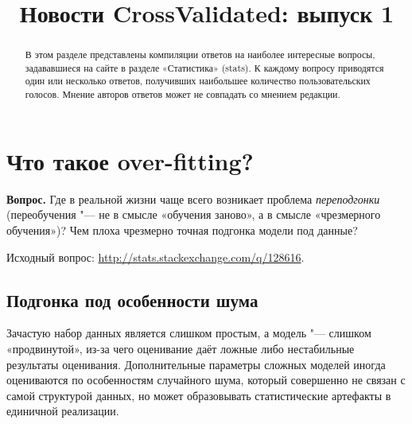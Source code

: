 \documentclass[final,pdftex]{../../template/epsilonj}
\begin{document}
\begin{frontmatter}
\title{Новости CrossValidated: выпуск 1}

\begin{aug}
\author{ }%



\address{НИУ ВШЭ, Москва.}
\end{aug}

\begin{abstract}
В этом разделе представлены компиляции ответов на наиболее интересные вопросы, задававшиеся на сайте  в разделе «Статистика» (stats). К каждому вопросу приводятся один или несколько ответов, получивших наибольшее количество пользовательских голосов. Мнение авторов ответов может не совпадать со мнением редакции.
\end{abstract}

\begin{keyword}
\end{keyword}

\end{frontmatter}


\section{Что такое over-fitting?}

\textbf{Вопрос.} Где в реальной жизни чаще всего возникает проблема \textit{переподгонки} (переобучения "--- не в смысле «обучения заново», а в смысле «чрезмерного обучения»)? Чем плоха чрезмерно точная подгонка модели под данные?

Исходный вопрос: \url{http://stats.stackexchange.com/q/128616}.

\subsection{Подгонка под особенности шума}

Зачастую набор данных является слишком простым, а модель "--- слишком «продвинутой», из-за чего оценивание даёт ложные либо нестабильные результаты оценивания. Дополнительные параметры сложных моделей иногда оцениваются по особенностям случайного шума, который совершенно не связан с самой структурой данных, но может образовывать статистические артефакты в единичной реализации. 
\end{document}
